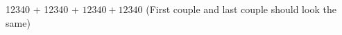 \documentclass[cdfont=true,cdmath=false]{tudscrreprt}
\begin{document}
  12340 + \num{12340} + \(12340 + \num{12340}\)
  (First couple and last couple should look the same)
\end{document}
